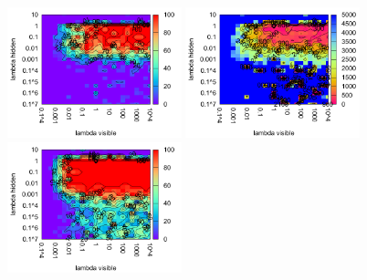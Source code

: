 


\begin{figure}[H]
  \centering
  \includegraphics[width=0.45\textwidth]{img/k3/tlr-3-success.pdf} 
  \includegraphics[width=0.45\textwidth]{img/k3/tlr-3-epoch.pdf}   
  \includegraphics[width=0.45\textwidth]{img/k3/tlr-5-success.pdf}   

\end{figure}
